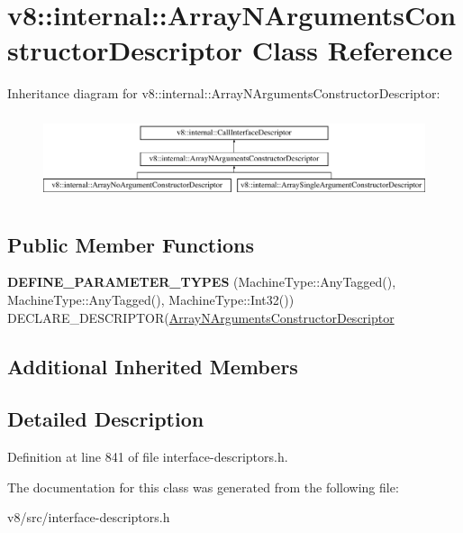 \hypertarget{classv8_1_1internal_1_1ArrayNArgumentsConstructorDescriptor}{}\section{v8\+:\+:internal\+:\+:Array\+N\+Arguments\+Constructor\+Descriptor Class Reference}
\label{classv8_1_1internal_1_1ArrayNArgumentsConstructorDescriptor}
Inheritance diagram for v8\+:\+:internal\+:\+:Array\+N\+Arguments\+Constructor\+Descriptor\+:\begin{figure}[H]
\begin{center}
\leavevmode
\includegraphics[height=2.507463cm]{classv8_1_1internal_1_1ArrayNArgumentsConstructorDescriptor}
\end{center}
\end{figure}
\subsection*{Public Member Functions}
\begin{DoxyCompactItemize}
\item 
\mbox{\label{classv8_1_1internal_1_1ArrayNArgumentsConstructorDescriptor_a881048f4cb6454fcdc3d21b3a9c6632c}} 
{\bfseries D\+E\+F\+I\+N\+E\+\_\+\+P\+A\+R\+A\+M\+E\+T\+E\+R\+\_\+\+T\+Y\+P\+ES} (Machine\+Type\+::\+Any\+Tagged(), Machine\+Type\+::\+Any\+Tagged(), Machine\+Type\+::\+Int32()) D\+E\+C\+L\+A\+R\+E\+\_\+\+D\+E\+S\+C\+R\+I\+P\+T\+OR(\mbox{\hyperlink{classv8_1_1internal_1_1ArrayNArgumentsConstructorDescriptor}{Array\+N\+Arguments\+Constructor\+Descriptor}}
\end{DoxyCompactItemize}
\subsection*{Additional Inherited Members}


\subsection{Detailed Description}


Definition at line 841 of file interface-\/descriptors.\+h.



The documentation for this class was generated from the following file\+:\begin{DoxyCompactItemize}
\item 
v8/src/interface-\/descriptors.\+h\end{DoxyCompactItemize}
